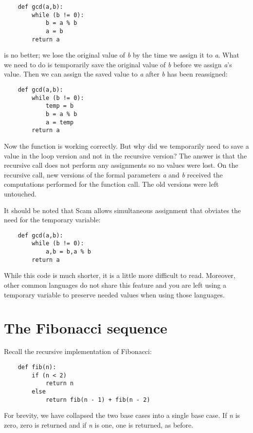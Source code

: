 \begin{verbatim}
    def gcd(a,b):
        while (b != 0):
            b = a % b
            a = b
        return a
\end{verbatim}

is no better; we lose the original value of {\it b} by the time we
assign it to {\it a}. What we need to do is temporarily save the
original value of {\it b} before we assign {\it a}'s value. Then
we can assign the saved value to {\it a} after {\it b} has been reassigned:

\begin{verbatim}
    def gcd(a,b):
        while (b != 0):
            temp = b
            b = a % b
            a = temp
        return a
\end{verbatim}

Now the function is working correctly. But why did we temporarily
need to save a value in the loop version and not in the recursive
version? The answer is that the recursive call does not perform
any assignments so no values were lost. On the recursive call,
new versions of the formal parameters {\it a} and {\it b} received the
computations performed for the function call. The old versions
were left untouched.

It should be noted that Scam allows simultaneous assignment that
obviates the need for the temporary variable:

\begin{verbatim}
    def gcd(a,b):
        while (b != 0):
            a,b = b,a % b
        return a
\end{verbatim}

While this code is much shorter, it is a little more difficult to
read. Moreover, other common languages do not share this feature
and you are left using a temporary variable to preserve needed
values when using those languages.

\section{The Fibonacci sequence}

Recall the recursive implementation of Fibonacci:

\begin{verbatim}
    def fib(n):
        if (n < 2)
            return n
        else
            return fib(n - 1) + fib(n - 2)
\end{verbatim}

For brevity, we have collapsed the two base cases into
a single base case. If {\it n} is zero, zero is returned and if
{\it n} is one, one is returned, as before.

